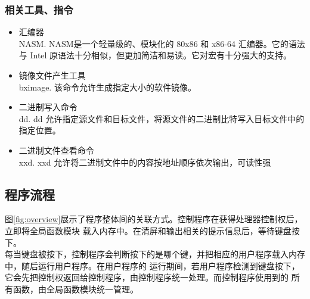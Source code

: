 \documentclass[a4paper]{article}
\begin{document}
    \subsubsection{相关工具、指令}
        \begin{itemize}
            \item 汇编器\\ 
            NASM. NASM是一个轻量级的、模块化的 80x86 和 x86-64 汇编器。它的语法与
            Intel 原语法十分相似，但更加简洁和易读。它对宏有十分强大的支持。
            \item 镜像文件产生工具\\ 
            bximage. 该命令允许生成指定大小的软件镜像。
            \item 二进制写入命令\\ 
            dd. dd 允许指定源文件和目标文件，将源文件的二进制比特写入目标文件中的指定位置。
            \item 二进制文件查看命令\\ 
            xxd. xxd 允许将二进制文件中的内容按地址顺序依次输出，可读性强
        \end{itemize}
    \subsection{程序流程}\label{subsec:programProcedure}
    图\ref{fig:overview}展示了程序整体间的关联方式。控制程序在获得处理器控制权后，立即将全局函数模块
    载入内存中。在清屏和输出相关的提示信息后，等待键盘按下。\\
    
    每当键盘被按下，控制程序会判断按下的是哪个键，并把相应的用户程序载入内存中，随后运行用户程序。在用户程序的
    运行期间，若用户程序检测到键盘按下，它会先把控制权返回给控制程序，由控制程序统一处理。而控制程序使用到的
    所有函数，由全局函数模块统一管理。\\
    
\end{document}
